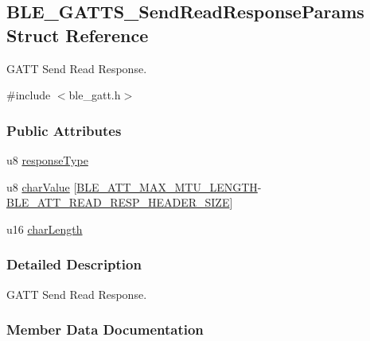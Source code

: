 \hypertarget{struct_b_l_e___g_a_t_t_s___send_read_response_params}{}\subsection{B\+L\+E\+\_\+\+G\+A\+T\+T\+S\+\_\+\+Send\+Read\+Response\+Params Struct Reference}
\label{struct_b_l_e___g_a_t_t_s___send_read_response_params}


G\+A\+TT Send Read Response.  




{\ttfamily \#include $<$ble\+\_\+gatt.\+h$>$}

\subsubsection*{Public Attributes}
\begin{DoxyCompactItemize}
\item 
u8 \hyperlink{struct_b_l_e___g_a_t_t_s___send_read_response_params_a562a1738eff391eaf2159c94fdf12009}{response\+Type}
\item 
u8 \hyperlink{struct_b_l_e___g_a_t_t_s___send_read_response_params_a7eed9942abd64d191289d452de715c1b}{char\+Value} \mbox{[}\hyperlink{group___b_l_e___g_a_t_t_ga380151ce5e77dadfae069f37afd70b8b}{B\+L\+E\+\_\+\+A\+T\+T\+\_\+\+M\+A\+X\+\_\+\+M\+T\+U\+\_\+\+L\+E\+N\+G\+TH}-\/\hyperlink{group___b_l_e___g_a_t_t_ga60b268cf9ce073bd7372e5c903f9aff8}{B\+L\+E\+\_\+\+A\+T\+T\+\_\+\+R\+E\+A\+D\+\_\+\+R\+E\+S\+P\+\_\+\+H\+E\+A\+D\+E\+R\+\_\+\+S\+I\+ZE}\mbox{]}
\item 
u16 \hyperlink{struct_b_l_e___g_a_t_t_s___send_read_response_params_aad488f8728f9e064d92e3eb91b6e5a96}{char\+Length}
\end{DoxyCompactItemize}


\subsubsection{Detailed Description}
G\+A\+TT Send Read Response. 

\subsubsection{Member Data Documentation}
